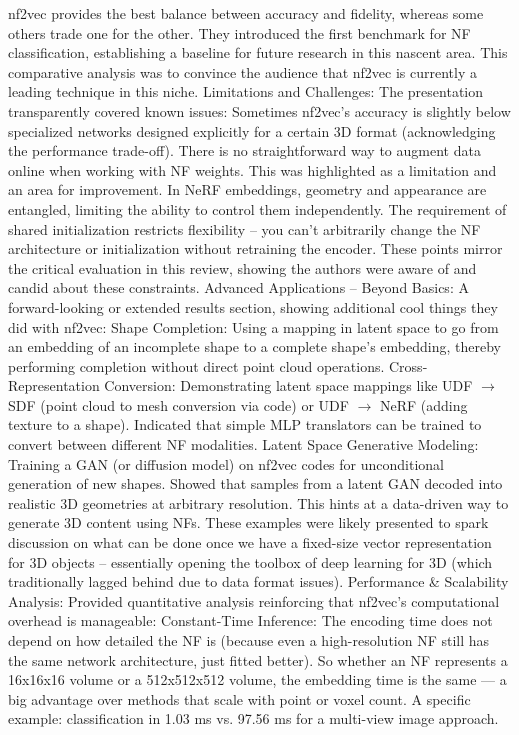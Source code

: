 \documentclass[11pt]{article}
\begin{document}
nf2vec provides the best balance between accuracy and fidelity, whereas some others trade one for the other.
They introduced the first benchmark for NF classification, establishing a baseline for future research in this nascent area. This comparative analysis was to convince the audience that nf2vec is currently a leading technique in this niche.
Limitations and Challenges: The presentation transparently covered known issues:
Sometimes nf2vec’s accuracy is slightly below specialized networks designed explicitly for a certain 3D format (acknowledging the performance trade-off).
There is no straightforward way to augment data online when working with NF weights. This was highlighted as a limitation and an area for improvement.
In NeRF embeddings, geometry and appearance are entangled, limiting the ability to control them independently.
The requirement of shared initialization restricts flexibility – you can’t arbitrarily change the NF architecture or initialization without retraining the encoder. These points mirror the critical evaluation in this review, showing the authors were aware of and candid about these constraints.
Advanced Applications – Beyond Basics: A forward-looking or extended results section, showing additional cool things they did with nf2vec:
Shape Completion: Using a mapping in latent space to go from an embedding of an incomplete shape to a complete shape’s embedding, thereby performing completion without direct point cloud operations.
Cross-Representation Conversion: Demonstrating latent space mappings like UDF $\to$ SDF (point cloud to mesh conversion via code) or UDF $\to$ NeRF (adding texture to a shape). Indicated that simple MLP translators can be trained to convert between different NF modalities.
Latent Space Generative Modeling: Training a GAN (or diffusion model) on nf2vec codes for unconditional generation of new shapes. Showed that samples from a latent GAN decoded into realistic 3D geometries at arbitrary resolution. This hints at a data-driven way to generate 3D content using NFs.
These examples were likely presented to spark discussion on what can be done once we have a fixed-size vector representation for 3D objects – essentially opening the toolbox of deep learning for 3D (which traditionally lagged behind due to data format issues).
Performance & Scalability Analysis: Provided quantitative analysis reinforcing that nf2vec’s computational overhead is manageable:
Constant-Time Inference: The encoding time does not depend on how detailed the NF is (because even a high-resolution NF still has the same network architecture, just fitted better). So whether an NF represents a 16x16x16 volume or a 512x512x512 volume, the embedding time is the same — a big advantage over methods that scale with point or voxel count. A specific example: classification in 1.03 ms vs. 97.56 ms for a multi-view image approach.
\end{document}
